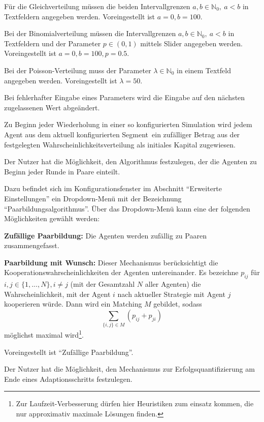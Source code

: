 \documentclass[parskip=full,11pt]{scrartcl}
\def\adapt{Adaptionsschritt}
\def\segment{Segment}
\begin{document}
Für die Gleichverteilung müssen die beiden Intervallgrenzen \(a,b \in \mathbb{N}_0, \ a < b\) in Textfeldern angegeben werden. Voreingestellt ist \(a = 0, b = 100\).

Bei der Binomialverteilung müssen die Intervallgrenzen \(a,b \in \mathbb{N}_0, \ a < b\) in Textfeldern und der Parameter \(p \in (0,1)\) mittels Slider angegeben werden. Voreingestellt ist \(a = 0, b = 100, p = 0.5\).

Bei der Poisson-Verteilung muss der Parameter \(\lambda \in \mathbb{N}_0\) in einem Textfeld angegeben werden. Voreingestellt ist \(\lambda = 50\).

Bei fehlerhafter Eingabe eines Parameters wird die Eingabe auf den nächsten zugelassenen Wert abgeändert.

Zu Beginn jeder Wiederholung in einer so konfigurierten Simulation wird jedem Agent aus dem aktuell konfigurierten \segment\ ein zufälliger Betrag aus der festgelegten Wahrscheinlichkeitsverteilung als initiales Kapital zugewiesen.


Der Nutzer hat die Möglichkeit, den Algorithmus festzulegen, der die Agenten zu Beginn jeder Runde in Paare einteilt.

Dazu befindet sich im Konfigurationsfenster im Abschnitt \enquote{Erweiterte Einstellungen} ein Dropdown-Menü mit der Bezeichnung \enquote{Paarbildungsalgorithmus}. Über das Dropdown-Menü kann eine der folgenden Möglichkeiten gewählt werden:

\textbf{Zufällige Paarbildung:}
Die Agenten werden zufällig zu Paaren zusammengefasst.

\textbf{Paarbildung mit Wunsch:}
Dieser Mechanismus berücksichtigt die Kooperationswahrscheinlichkeiten der Agenten untereinander. Es bezeichne \(p_{ij}\) für \(i,j \in \{1,...,N\}, i \neq j\) (mit der Gesamtzahl \(N\) aller Agenten) die Wahrscheinlichkeit, mit der Agent \(i\) nach aktueller Strategie mit Agent \(j\) kooperieren würde. Dann wird ein Matching \(M\) gebildet, sodass
\[
\sum_{\{i,j\} \in M} \left(p_{ij} + p_{ji}\right)
\]
möglichst maximal wird\footnote{Zur Laufzeit-Verbesserung dürfen hier Heuristiken zum einsatz kommen, die nur approximativ maximale Lösungen finden.}.

Voreingestellt ist \enquote{Zufällige Paarbildung}.

Der Nutzer hat die Möglichkeit, den Mechanismus zur Erfolgsquantifizierung am Ende eines \adapt s festzulegen.
\end{document}
